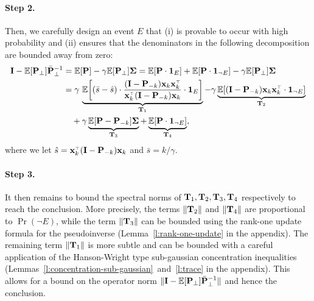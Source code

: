 \documentclass{article}
\begin{document}
 \paragraph{Step 2.} Then, we carefully design an event $E$ that (i)
 is provable to occur with high probability and (ii) ensures that the
 denominators in the following decomposition are bounded away from
 zero:
  \begin{align*}
  \I-\E[\P_\perp]\bar\P_\perp^{-1}
    &= \E[\P] - \gamma\E[\P_\perp]\Sigmab = \E[\P \cdot \one_E] +
    \E[\P  \cdot \one_{\neg E}]
    -\gamma\E[\P_\perp]\Sigmab\\
  &=\gamma\,\underbrace{\E\bigg[(\bar s-\hat
    s)\cdot\frac{(\I -\P_{-k})\x_k\x_k^\top}{\x_k^\top(\I -\P_{-k})\x_k} \cdot \one_E\bigg]}_{\T_1}
    - \gamma \underbrace{\E[ (\I - \P_{-k}) \x_k\x_k^\top \cdot \one_{\neg E}]}_{\T_2} \\ 
    &\quad+ \gamma \underbrace{\E[\P-\P_{-k}]\Sigmab}_{\T_3} + \underbrace{\E[\P \cdot \one_{\neg E}]}_{\T_4},
\end{align*}
where we let $\hat s = \x_k^\top(\I - \P_{-k})\x_k$ and $\bar s=k/\gamma$. 
\paragraph{Step 3.}
It then remains to bound the spectral norms of $ \mathbf{T}_1, \mathbf{T}_2, \mathbf{T}_3
,\mathbf{T}_4$ respectively to reach the conclusion. More precisely, the terms
$\| \mathbf{T}_2 \| $ and $\| \mathbf{T}_4 \|$ are proportional to $\Pr (\neg E)$,
while the term $\| \mathbf{T}_3 \|$ can be bounded using the rank-one update
formula for the pseudoinverse (Lemma~\ref{l:rank-one-update} in the
appendix). The remaining term $\| \mathbf{T}_1 \|$ is more subtle and can be
bounded with a careful application of  the Hanson-Wright type
\cite{rudelson2013hanson} sub-gaussian concentration 
inequalities (Lemmas~\ref{l:concentration-sub-gaussian}~and~\ref{l:trace} in the
appendix). This allows for a bound on the operator norm $\| \mathbf I -
\mathbb E[\mathbf P_\perp ] \bar {\mathbf P}_\perp^{-1}\| $ and hence the conclusion. 
\end{document}
